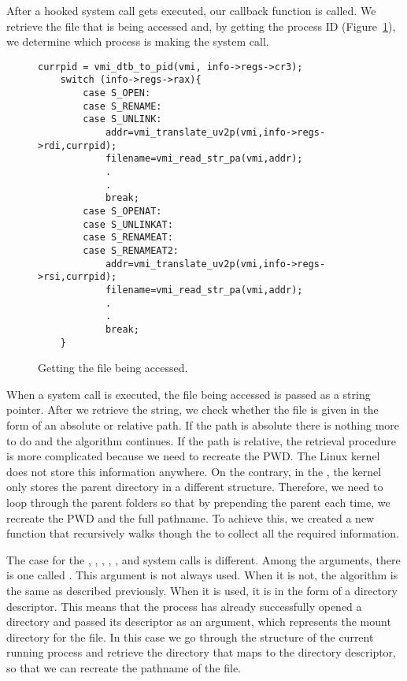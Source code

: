 After a hooked system call gets executed, our callback function is called. We retrieve the file that is being accessed and, by getting the  process ID (Figure~\ref{fig:getfile}), we determine which process is making the system call. 

\begin{figure}[ht]
\selectfont
\begin{lstlisting}[style=CStyle]
	currpid = vmi_dtb_to_pid(vmi, info->regs->cr3);
	switch (info->regs->rax){
		case S_OPEN:
		case S_RENAME:
		case S_UNLINK:
			addr=vmi_translate_uv2p(vmi,info->regs->rdi,currpid);
			filename=vmi_read_str_pa(vmi,addr);
			.
			.
			break;
		case S_OPENAT:
		case S_UNLINKAT:
		case S_RENAMEAT:
		case S_RENAMEAT2:
			addr=vmi_translate_uv2p(vmi,info->regs->rsi,currpid);
			filename=vmi_read_str_pa(vmi,addr);
			.
			.
			break;	
	}
\end{lstlisting}
	\caption{Getting the file being accessed.}
	\label{fig:getfile}
\end{figure}


\par When a system call is executed, the file being accessed is passed as a string pointer. After we retrieve the string, we check whether the file is given in the form of an absolute or relative path. If the path is absolute there is nothing more to do and the algorithm continues. If the path is relative, the retrieval procedure is more complicated because we need to recreate the \ac{PWD}. The Linux kernel does not store this information anywhere. On the contrary, in the , the kernel only stores the parent directory in a different structure. Therefore, we need to loop through the parent folders so that by prepending the parent each time, we recreate the \ac{PWD} and the full pathname. To achieve this, we created a new function that recursively walks though the  to collect all the required information. 

\par The case for the , , , , , and  system calls is different. Among the arguments, there is one called . This argument is not always used. When it is not, the algorithm is the same as described previously. When it is used, it is in the form of a directory descriptor. This means that the process has already successfully opened a directory and passed its descriptor as an argument, which represents the mount directory for the file. In this case we go through the  structure of the current running process and retrieve the directory that maps to the directory descriptor, so that we can recreate the pathname of the file.

